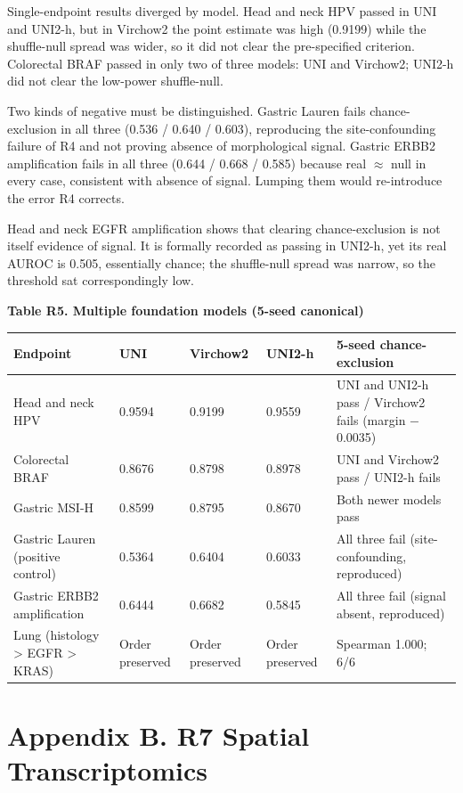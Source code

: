 Single-endpoint results diverged by model. Head and neck HPV passed in UNI and UNI2-h, but in Virchow2 the point estimate was high (0.9199) while the shuffle-null spread was wider, so it did not clear the pre-specified criterion. Colorectal BRAF passed in only two of three models: UNI and Virchow2; UNI2-h did not clear the low-power shuffle-null.

Two kinds of negative must be distinguished. Gastric Lauren fails chance-exclusion in all three (0.536 / 0.640 / 0.603), reproducing the site-confounding failure of R4 and not proving absence of morphological signal. Gastric ERBB2 amplification fails in all three (0.644 / 0.668 / 0.585) because real $\approx$ null in every case, consistent with absence of signal. Lumping them would re-introduce the error R4 corrects.

Head and neck EGFR amplification shows that clearing chance-exclusion is not itself evidence of signal. It is formally recorded as passing in UNI2-h, yet its real AUROC is 0.505, essentially chance; the shuffle-null spread was narrow, so the threshold sat correspondingly low.

\textbf{Table R5. Multiple foundation models (5-seed canonical)}

\begin{table}[ht]\centering\footnotesize
\begin{tabular}{lllll}\hline
Endpoint & UNI & Virchow2 & UNI2-h & 5-seed chance-exclusion \\\hline
Head and neck HPV & 0.9594 & 0.9199 & 0.9559 & UNI and UNI2-h pass / Virchow2 fails (margin $-$0.0035) \\
Colorectal BRAF & 0.8676 & 0.8798 & 0.8978 & UNI and Virchow2 pass / UNI2-h fails \\
Gastric MSI-H & 0.8599 & 0.8795 & 0.8670 & Both newer models pass \\
Gastric Lauren (positive control) & 0.5364 & 0.6404 & 0.6033 & All three fail (site-confounding, reproduced) \\
Gastric ERBB2 amplification & 0.6444 & 0.6682 & 0.5845 & All three fail (signal absent, reproduced) \\
Lung (histology > EGFR > KRAS) & Order preserved & Order preserved & Order preserved & Spearman 1.000; 6/6 \\
\hline\end{tabular}\end{table}

\section*{Appendix B. R7 Spatial Transcriptomics}

